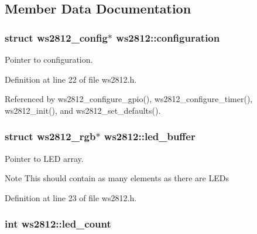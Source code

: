 \subsection{Member Data Documentation}
\hypertarget{structws2812_a4b69cc515557cd305ebfd3372fc09f81}{}
\subsubsection[{configuration}]{\setlength{\rightskip}{0pt plus 5cm}struct {\bf ws2812\+\_\+config}$\ast$ ws2812\+::configuration}\label{structws2812_a4b69cc515557cd305ebfd3372fc09f81}


Pointer to configuration. 



Definition at line 22 of file ws2812.\+h.



Referenced by ws2812\+\_\+configure\+\_\+gpio(), ws2812\+\_\+configure\+\_\+timer(), ws2812\+\_\+init(), and ws2812\+\_\+set\+\_\+defaults().

\hypertarget{structws2812_a9d672a2d9ea381c7fcd940ba4ebdebe2}{}
\subsubsection[{led\+\_\+buffer}]{\setlength{\rightskip}{0pt plus 5cm}struct {\bf ws2812\+\_\+rgb}$\ast$ ws2812\+::led\+\_\+buffer}\label{structws2812_a9d672a2d9ea381c7fcd940ba4ebdebe2}


Pointer to L\+E\+D array. 

\begin{DoxyNote}{Note}
This should contain as many elements as there are L\+E\+Ds 
\end{DoxyNote}


Definition at line 23 of file ws2812.\+h.

\hypertarget{structws2812_aaed6db83ce4a0e8e58b73650f2b4638e}{}
\subsubsection[{led\+\_\+count}]{\setlength{\rightskip}{0pt plus 5cm}int ws2812\+::led\+\_\+count}\label{structws2812_aaed6db83ce4a0e8e58b73650f2b4638e}


